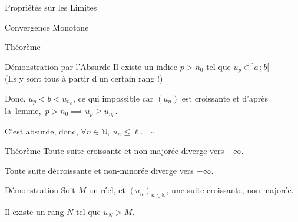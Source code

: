 \documentclass{coursbook}
\begin{document}
\begin{Gpartie}{Propriétés sur les Limites}
\begin{Spartie}{Convergence Monotone}
\begin{SSpartie}{Théorème}
\begin{SSSpartie}{Démonstration par l'Absurde}
                    Il existe un indice $p>n_0$ tel que $u_p\in\big]a\,; b\big[$ \\ (Ils y sont tous à partir d'un certain rang !)

                    Donc, $u_p<b<u_{n_0}$, ce qui impossible car $(u_n)$ est croissante et d'après la~lemme,~$p>n_0\implies u_p\geq u_{n_0}$.

                    C'est absurde, donc, $\forall n\in\mathbb{N},~u_n\leq\ell$.$\quad\square$
                \end{SSSpartie}
            \end{SSpartie}
            \vfill
            \pagebreak
            \begin{SSpartie}{Théorème} 
                Toute suite croissante et non-majorée diverge vers $+\infty$.

                Toute suite décroissante et non-minorée diverge vers $-\infty$.

                \begin{SSSpartie}{Démonstration} 
                    Soit $M$ un réel, et $(u_n)_{n\in\mathbb{N}}$, une suite croissante, non-majorée.

                    Il existe un rang $N$ tel que $u_N>M$.


\end{SSSpartie}
\end{SSpartie}
\end{Spartie}
\end{Gpartie}
\end{document}
